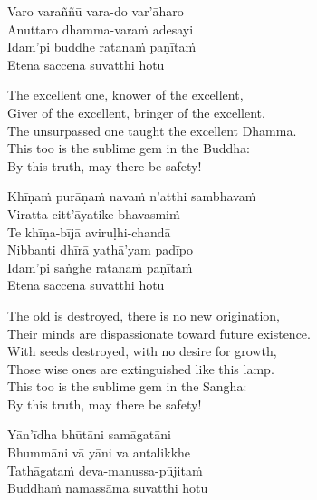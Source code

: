 \begin{pali-hang-continued}
  Varo varaññū vara-do var'āharo\\
  Anuttaro dhamma-varaṁ adesayi\\
  Idam'pi buddhe ratanaṁ paṇītaṁ\\
  Etena saccena suvatthi hotu
\end{pali-hang-continued}

\begin{english-verses}
  The excellent one, knower of the excellent,\\
  Giver of the excellent, bringer of the excellent,\\
  The unsurpassed one taught the excellent Dhamma.\\
  This too is the sublime gem in the Buddha:\\
  By this truth, may there be safety!
\end{english-verses}

\begin{pali-hang-continued}
  Khīṇaṁ purāṇaṁ navaṁ n'atthi sambhavaṁ\\
  Viratta-citt'āyatike bhavasmiṁ\\
  Te khīṇa-bījā aviruḷhi-chandā\\
  Nibbanti dhīrā yathā'yam padīpo\\
  Idam'pi saṅghe ratanaṁ paṇītaṁ\\
  Etena saccena suvatthi hotu
\end{pali-hang-continued}

\begin{english-verses}
  The old is destroyed, there is no new origination,\\
  Their minds are dispassionate toward future existence.\\
  With seeds destroyed, with no desire for growth,\\
  Those wise ones are extinguished like this lamp.\\
  This too is the sublime gem in the Sangha:\\
  By this truth, may there be safety!
\end{english-verses}

\begin{pali-hang-continued}
  Yān'īdha bhūtāni samāgatāni\\
  Bhummāni vā yāni va antalikkhe\\
  Tathāgataṁ deva-manussa-pūjitaṁ\\
  Buddhaṁ namassāma suvatthi hotu
\end{pali-hang-continued}

